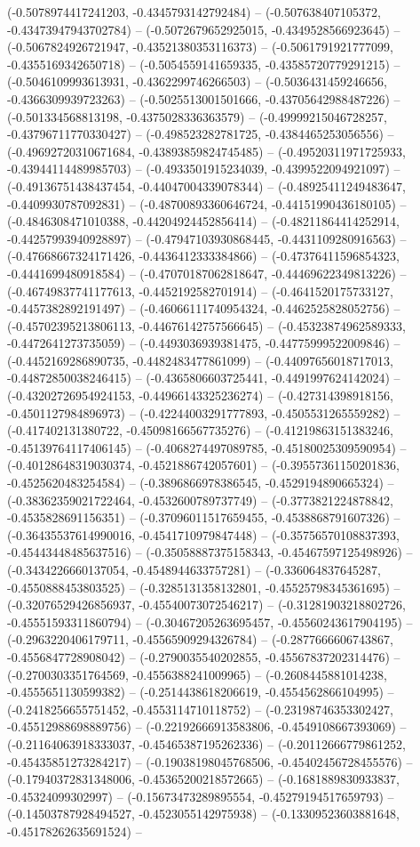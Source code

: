 (-0.5078974417241203, -0.4345793142792484) -- (-0.507638407105372, -0.43473947943702784) -- (-0.5072679652925015, -0.4349528566923645) -- (-0.5067824926721947, -0.43521380353116373) -- (-0.5061791921777099, -0.4355169342650718) -- (-0.5054559141659335, -0.43585720779291215) -- (-0.5046109993613931, -0.4362299746266503) -- (-0.5036431459246656, -0.4366309939723263) -- (-0.5025513001501666, -0.43705642988487226) -- (-0.501334568813198, -0.4375028336363579) -- (-0.49999215046728257, -0.43796711770330427) -- (-0.498523282781725, -0.4384465253056556) -- (-0.49692720310671684, -0.43893859824745485) -- (-0.49520311971725933, -0.43944114489985703) -- (-0.4933501915234039, -0.4399522094921097) -- (-0.49136751438437454, -0.44047004339078344) -- (-0.48925411249483647, -0.4409930787092831) -- (-0.48700893360646724, -0.44151990436180105) -- (-0.4846308471010388, -0.44204924452856414) -- (-0.48211864414252914, -0.44257993940928897) -- (-0.47947103930868445, -0.4431109280916563) -- (-0.47668667324171426, -0.4436412333384866) -- (-0.47376411596854323, -0.4441699480918584) -- (-0.47070187062818647, -0.44469622349813226) -- (-0.46749837741177613, -0.4452192582701914) -- (-0.4641520175733127, -0.4457382892191497) -- (-0.46066111740954324, -0.4462525828052756) -- (-0.45702395213806113, -0.44676142757566645) -- (-0.45323874962589333, -0.4472641273735059) -- (-0.4493036939381475, -0.44775999522009846) -- (-0.4452169286890735, -0.4482483477861099) -- (-0.44097656018717013, -0.44872850038246415) -- (-0.4365806603725441, -0.4491997624142024) -- (-0.43202726954924153, -0.44966143325236274) -- (-0.427314398918156, -0.4501127984896973) -- (-0.42244003291777893, -0.4505531265559282) -- (-0.417402131380722, -0.45098166567735276) -- (-0.41219863151383246, -0.45139764117406145) -- (-0.4068274497089785, -0.45180025309590954) -- (-0.40128648319030374, -0.4521886742057601) -- (-0.39557361150201836, -0.4525620483254584) -- (-0.3896866978386545, -0.4529194890665324) -- (-0.38362359021722464, -0.4532600789737749) -- (-0.3773821224878842, -0.4535828691156351) -- (-0.37096011517659455, -0.4538868791607326) -- (-0.36435537614990016, -0.4541710979847448) -- (-0.35756570108837393, -0.45443448485637516) -- (-0.35058887375158343, -0.45467597125498926) -- (-0.3434226660137054, -0.4548944633757281) -- (-0.336064837645287, -0.4550888453803525) -- (-0.3285131358132801, -0.45525798345361695) -- (-0.32076529426856937, -0.45540073072546217) -- (-0.31281903218802726, -0.45551593311860794) -- (-0.30467205263695457, -0.45560243617904195) -- (-0.2963220406179711, -0.45565909294326784) -- (-0.2877666606743867, -0.4556847728908042) -- (-0.2790035540202855, -0.45567837202314476) -- (-0.2700303351764569, -0.4556388241009965) -- (-0.2608445881014238, -0.4555651130599382) -- (-0.2514438618206619, -0.4554562866104995) -- (-0.2418256655751452, -0.4553114710118752) -- (-0.23198746353302427, -0.45512988698889756) -- (-0.22192666913583806, -0.4549108667393069) -- (-0.21164063918333037, -0.45465387195262336) -- (-0.20112666779861252, -0.45435851273284217) -- (-0.19038198045768506, -0.45402456728455576) -- (-0.17940372831348006, -0.45365200218572665) -- (-0.1681889830933837, -0.45324099302997) -- (-0.15673473289895554, -0.45279194517659793) -- (-0.14503787928494527, -0.4523055142975938) -- (-0.13309523603881648, -0.45178262635691524) -- 